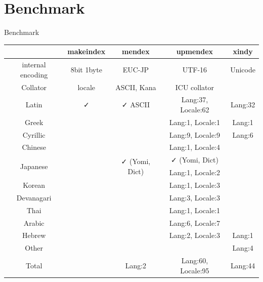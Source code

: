 \documentclass[aspectratio=169,10pt]{beamer}
\begin{document}

\section{Benchmark}
\begin{frame}{Benchmark}

\begin{center}
\footnotesize
\begin{tabular}{c|c|c|c|c}
            & makeindex & mendex      & upmendex            & xindy   \\\hline\hline
internal encoding & 8bit 1byte & EUC-JP    & UTF-16         & Unicode \\
Collator    & locale    & ASCII, Kana & ICU collator        &         \\\hline
Latin       & ✓        & ✓ ASCII    & Lang:37, Locale:62  & Lang:32 \\
Greek       &           &             & Lang:1, Locale:1    & Lang:1 \\
Cyrillic    &           &             & Lang:9, Locale:9    & Lang:6 \\\hdashline
Chinese     &           &             & Lang:1, Locale:4    &  \\
\multirow{2}{*}{Japanese} & & \multirow{2}{*}{✓ (Yomi, Dict)} & ✓ (Yomi, Dict) & \\
            &           &             & Lang:1, Locale:2    & \\
Korean      &           &             & Lang:1, Locale:3    & \\\hdashline
Devanagari  &           &             & Lang:3, Locale:3    & \\
Thai        &           &             & Lang:1, Locale:1    & \\
Arabic      &           &             & Lang:6, Locale:7    & \\
Hebrew      &           &             & Lang:2, Locale:3    & Lang:1  \\\hdashline
Other       &           &             &                     & Lang:4  \\\hline
Total       &           & Lang:2      & Lang:60, Locale:95  & Lang:44 \\
\end{tabular}
\end{center}

\end{frame}

\end{document}
